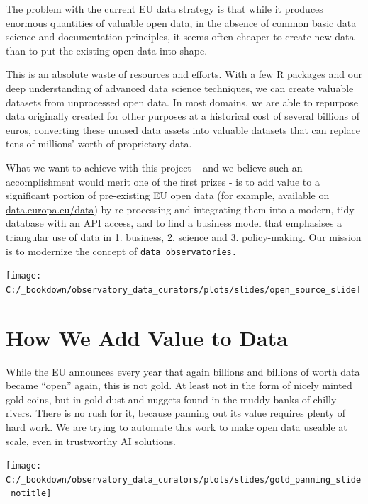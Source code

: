 \documentclass[
  a4paper,
  openany, a4paper, oneside]{book}
\begin{document}
The problem with the current EU data strategy is that while it produces enormous quantities of valuable open data, in the absence of common basic data science and documentation principles, it seems often cheaper to create new data than to put the existing open data into shape.

This is an absolute waste of resources and efforts. With a few R packages and our deep understanding of advanced data science techniques, we can create valuable datasets from unprocessed open data. In most domains, we are able to repurpose data originally created for other purposes at a historical cost of several billions of euros, converting these unused data assets into valuable datasets that can replace tens of millions' worth of proprietary data.

What we want to achieve with this project -- and we believe such an accomplishment would merit one of the first prizes - is to add value to a significant portion of pre-existing EU open data (for example, available on \href{https://data.europa.eu/data/}{data.europa.eu/data}) by re-processing and integrating them into a modern, tidy database with an API access, and to find a business model that emphasises a triangular use of data in 1. business, 2. science and 3. policy-making. Our mission is to modernize the concept of \texttt{data\ observatories.}

\begin{center}\texttt{[image: C:/\_bookdown/observatory\_data\_curators/plots/slides/open\_source\_slide]} \end{center}

\hypertarget{add-value}{%
\section{How We Add Value to Data}\label{add-value}}

While the EU announces every year that again billions and billions of worth data became ``open'' again, this is not gold. At least not in the form of nicely minted gold coins, but in gold dust and nuggets found in the muddy banks of chilly rivers. There is no rush for it, because panning out its value requires plenty of hard work. We are trying to automate this work to make open data useable at scale, even in trustworthy AI solutions.

\begin{center}\texttt{[image: C:/\_bookdown/observatory\_data\_curators/plots/slides/gold\_panning\_slide\_notitle]} \end{center}
\end{document}
